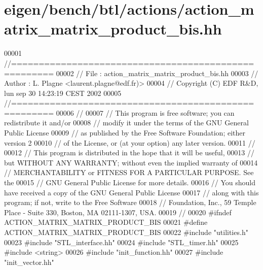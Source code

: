 \hypertarget{eigen_2bench_2btl_2actions_2action__matrix__matrix__product__bis_8hh_source}{}\section{eigen/bench/btl/actions/action\+\_\+matrix\+\_\+matrix\+\_\+product\+\_\+bis.hh}
\label{eigen_2bench_2btl_2actions_2action__matrix__matrix__product__bis_8hh_source}

\begin{DoxyCode}
00001 \textcolor{comment}{//=====================================================}
00002 \textcolor{comment}{// File   :  action\_matrix\_matrix\_product\_bis.hh}
00003 \textcolor{comment}{// Author :  L. Plagne <laurent.plagne@edf.fr)>}
00004 \textcolor{comment}{// Copyright (C) EDF R&D,  lun sep 30 14:23:19 CEST 2002}
00005 \textcolor{comment}{//=====================================================}
00006 \textcolor{comment}{//}
00007 \textcolor{comment}{// This program is free software; you can redistribute it and/or}
00008 \textcolor{comment}{// modify it under the terms of the GNU General Public License}
00009 \textcolor{comment}{// as published by the Free Software Foundation; either version 2}
00010 \textcolor{comment}{// of the License, or (at your option) any later version.}
00011 \textcolor{comment}{//}
00012 \textcolor{comment}{// This program is distributed in the hope that it will be useful,}
00013 \textcolor{comment}{// but WITHOUT ANY WARRANTY; without even the implied warranty of}
00014 \textcolor{comment}{// MERCHANTABILITY or FITNESS FOR A PARTICULAR PURPOSE.  See the}
00015 \textcolor{comment}{// GNU General Public License for more details.}
00016 \textcolor{comment}{// You should have received a copy of the GNU General Public License}
00017 \textcolor{comment}{// along with this program; if not, write to the Free Software}
00018 \textcolor{comment}{// Foundation, Inc., 59 Temple Place - Suite 330, Boston, MA  02111-1307, USA.}
00019 \textcolor{comment}{//}
00020 \textcolor{preprocessor}{#ifndef ACTION\_MATRIX\_MATRIX\_PRODUCT\_BIS}
00021 \textcolor{preprocessor}{#define ACTION\_MATRIX\_MATRIX\_PRODUCT\_BIS}
00022 \textcolor{preprocessor}{#include "utilities.h"}
00023 \textcolor{preprocessor}{#include "STL\_interface.hh"}
00024 \textcolor{preprocessor}{#include "STL\_timer.hh"}
00025 \textcolor{preprocessor}{#include <string>}
00026 \textcolor{preprocessor}{#include "init\_function.hh"}
00027 \textcolor{preprocessor}{#include "init\_vector.hh"}

\end{DoxyCode}
